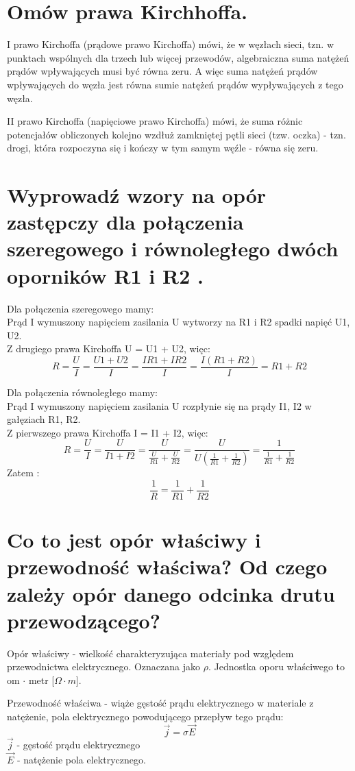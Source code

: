 \documentclass[a4paper,11pt]{article} %
\begin{document}
\section{Omów prawa Kirchhoffa.}
I prawo Kirchoffa (prądowe prawo Kirchoffa) mówi, że w węzłach sieci, tzn. w punktach wspólnych dla trzech lub więcej przewodów, algebraiczna suma natężeń prądów wpływających musi być równa zeru. A więc suma natężeń prądów wpływających do węzła jest równa sumie natężeń prądów wypływających z tego węzła.

II prawo Kirchoffa (napięciowe prawo Kirchoffa) mówi, że suma różnic potencjałów obliczonych kolejno wzdłuż zamkniętej pętli sieci (tzw. oczka) - tzn. drogi, która rozpoczyna się i kończy w tym samym węźle - równa się zeru.

\section{Wyprowadź wzory na opór zastępczy dla połączenia szeregowego i równoległego
dwóch oporników R1 i R2 .
}
Dla połączenia szeregowego mamy:\\
Prąd I wymuszony napięciem zasilania U wytworzy na R1 i R2 spadki napięć U1, U2. \\Z drugiego prawa Kirchoffa U = U1 + U2, więc:\\
$$R = \frac{U}{I} = \frac{U1+U2}{I} = \frac{IR1 + IR2}{I} = \frac{I(R1+R2)}{I} = R1 + R2$$

Dla połączenia równoległego mamy: \\
Prąd I wymuszony napięciem zasilania U rozpłynie się na prądy I1, I2 w gałęziach R1, R2. \\
Z pierwszego prawa Kirchoffa I = I1 + I2, więc: \\
$$R = \frac{U}{I} = \frac{U}{I1+I2} = \frac{U}{\frac{U}{R1}+\frac{U}{R2}} = \frac{U}{U(\frac{1}{R1}+\frac{1}{R2})} = \frac{1}{\frac{1}{R1}+\frac{1}{R2}} $$
Zatem :
$$\frac{1}{R} = \frac{1}{R1} + \frac{1}{R2}$$

\section{Co to jest opór właściwy i przewodność właściwa? Od czego zależy opór
danego odcinka drutu przewodzącego? }
Opór właściwy - wielkość charakteryzująca materiały pod względem przewodnictwa elektrycznego. Oznaczana jako $ \rho$. Jednostka oporu właściwego to om $\cdot$ metr [$\Omega \cdot m$].

Przewodność właściwa - wiąże gęstość prądu elektrycznego w materiale z natężenie, pola elektrycznego powodującego przepływ tego prądu:
$$\vec{j} = \sigma \vec{E}$$
$\vec{j}$ - gęstość prądu elektrycznego\\
$\vec{E}$ - natężenie pola elektrycznego.
\end{document}
